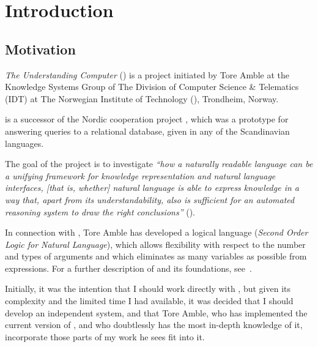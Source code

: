 
\chapter{Introduction}
\label{intro}

\section{Motivation}
\label{tucc}

{\em The Understanding Computer\/} ({\tuc}) is a project initiated by
Tore Amble at the Knowledge Systems Group of The Division of Computer
Science \& Telematics (IDT) at The Norwegian Institute of Technology
({\nit}), Trondheim, Norway.

{\tuc} is a successor of the Nordic cooperation project {\hsql}, which
was a prototype for answering queries to a relational database, given
in any of the Scandinavian languages.

The goal of the project is to investigate {\em ``how a naturally
readable language can be a unifying framework for knowledge
representation and natural language interfaces, {\em [that is,
whether]} natural language is able to express knowledge in a way that,
apart from its understandability, also is sufficient for an automated
reasoning system to draw the right conclusions''} (\cite{solon}).

In connection with {\tuc}, Tore Amble has developed a logical language
{\solon} ({\em Second Order Logic for Natural Language\/}), which
allows flexibility with respect to the number and types of arguments
and which eliminates as many variables as possible from expressions.
For a further description of {\tuc} and its foundations,
see~\cite{solon}.

Initially, it was the intention that I should work directly with
{\tuc}, but given its complexity and the limited time I had available,
it was decided that I should develop an independent system, and that
Tore Amble, who has implemented the current version of {\tuc}, and who
doubtlessly has the most in-depth knowledge of it, incorporate those
parts of my work he sees fit into it.

